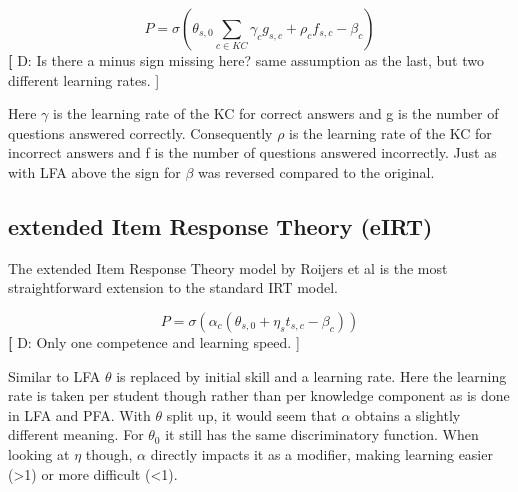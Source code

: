 \documentclass{scrartcl}
\providecommand{\comm}[1]{{\textbf[ #1 ]}}
\providecommand{\commd}[1]{\comm{D: {#1}}}
\begin{document}
\begin{equation}
\label{eq:pfa}
P = \sigma(\theta_{s,0} \sum_{c \in KC}  \gamma_{c} g_{s,c} + \rho_{c} f_{s,c} - \beta_{c})
\end{equation}
\commd{Is there a minus sign missing here? same assumption as the last, but two different learning rates. }

Here $\gamma$ is the learning rate of the KC for correct answers and g is the number of questions answered correctly. Consequently $\rho$ is the learning rate of the KC for incorrect answers and f is the number of questions answered incorrectly. Just as with LFA above the sign for $\beta$ was reversed compared to the original.

\subsection{extended Item Response Theory (eIRT)}
\label{sec:eirt}
The extended Item Response Theory model by Roijers et al \cite{eirt} is the most straightforward extension to the standard IRT model.

\begin{equation}
\label{eq:eirt}
P = \sigma(\alpha_{c} (\theta_{s,0} + \eta_{s} t_{s,c} - \beta_{c}))
\end{equation}
\commd{Only one competence and learning speed.}

Similar to LFA $\theta$ is replaced by initial skill and a learning rate. Here the learning rate is taken per student though rather than per knowledge component as is done in LFA and PFA. With $\theta$ split up, it would seem that $\alpha$ obtains a slightly different meaning. For $\theta_{0}$ it still has the same discriminatory function. When looking at $\eta$ though, $\alpha$ directly impacts it as a modifier, making learning easier (>1) or more difficult (<1).
\end{document}
